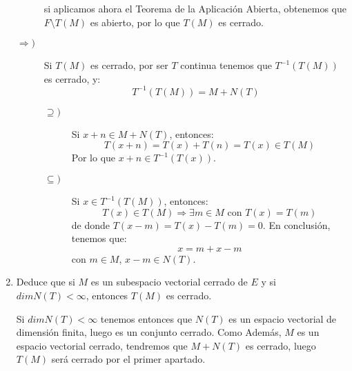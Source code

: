 \begin{ejercicio}
\begin{enumerate}
\begin{description}
\begin{description}
                    \end{description}
                    si aplicamos ahora el Teorema de la Aplicación Abierta, obtenemos que $F\setminus T(M)$ es abierto, por lo que $T(M)$ es cerrado.
                \item [$\Longrightarrow )$] Si $T(M)$ es cerrado, por ser $T$ continua tenemos que $T^{-1}(T(M))$ es cerrado, y:
                    \begin{equation*}
                        T^{-1}(T(M)) = M+N(T)
                    \end{equation*}
                    \begin{description}
                        \item [$\supseteq )$] Si $x+n\in M+N(T)$, entonces:
                            \begin{equation*}
                                T(x+n) = T(x)+T(n) = T(x) \in T(M)
                            \end{equation*}
                            Por lo que $x+n\in T^{-1}(T(x))$.
                        \item [$\subseteq )$] Si $x\in T^{-1}(T(M))$, entonces:
                            \begin{equation*}
                                T(x) \in T(M) \Longrightarrow \exists m\in M \text{\ con\ } T(x) = T(m)
                            \end{equation*}
                            de donde $T(x-m) = T(x)-T(m) = 0$. En conclusión, tenemos que:
                            \begin{equation*}
                                x = m + x - m
                            \end{equation*}
                            con $m\in M$, $x-m\in N(T)$.
                    \end{description}
            \end{description}
        \item Deduce que si $M$ es un subespacio vectorial cerrado de $E$ y si $dim N(T)<\infty$, entonces $T(M)$ es cerrado.

            Si $dim N(T)<\infty$ tenemos entonces que $N(T)$ es un espacio vectorial de dimensión finita, luego es un conjunto cerrado. Como Además, $M$ es un espacio vectorial cerrado, tendremos que $M+N(T)$ es cerrado, luego $T(M)$ será cerrado por el primer apartado.
    \end{enumerate}


\end{ejercicio}
